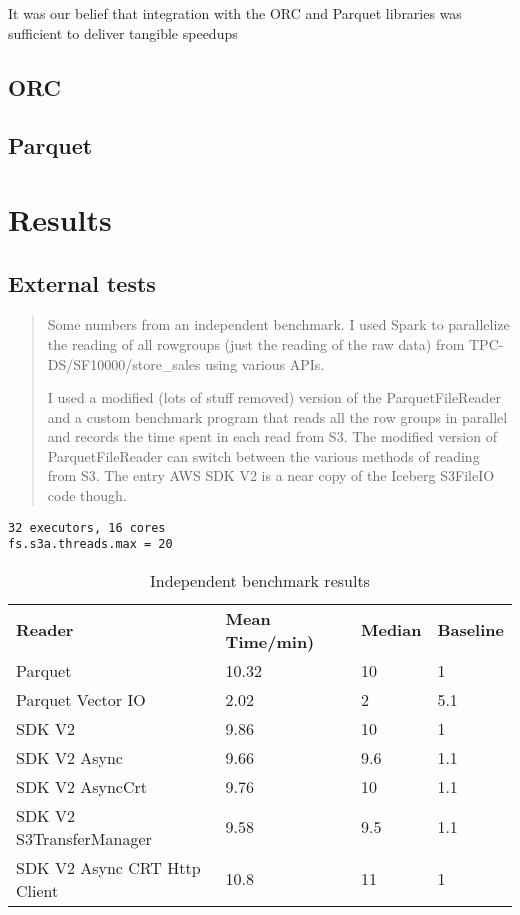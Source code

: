 \documentclass[manuscript]{acmart}
\begin{document}
It was our belief that integration with the ORC and Parquet libraries was
sufficient to deliver tangible speedups
\subsection{ORC}\label{subsec:orc}

\subsection{Parquet}\label{subsec:parquet}



\section{Results}
\label{sec:results}

\subsection{External tests}\label{subsec:external-tests}

\begin{quotation}
 Some numbers from an independent benchmark.
 I used Spark to parallelize the reading of all rowgroups (just the reading of the raw data)
 from TPC-DS/SF10000/store_sales using various APIs.

I used a modified (lots of stuff removed) version of the ParquetFileReader and a custom
benchmark program that reads all the row groups in parallel and records the time spent in each read from S3.
The modified version of ParquetFileReader can switch between the various methods of reading from S3.
The entry AWS SDK V2 is a near copy of the Iceberg S3FileIO code though.

\end{quotation}

\begin{verbatim}
32 executors, 16 cores
fs.s3a.threads.max = 20
\end{verbatim}

\begin{table}
  \begin{tabular}{ l l l l }
    \hline
    \textbf{Reader} & \textbf{Mean Time/min)} & \textbf{Median} & \textbf{Baseline}\\
    Parquet	& 10.32	& 10 & 1 \\
    Parquet Vector IO	& 2.02 & 2	& 5.1 \\
    SDK V2 & 9.86 & 10 & 1 \\
    SDK V2 Async & 9.66	& 9.6 & 1.1 \\
    SDK V2 AsyncCrt	& 9.76 & 10 & 1.1 \\
    SDK V2 S3TransferManager & 9.58 & 9.5 & 1.1 \\
    SDK V2 Async CRT Http Client & 10.8 & 11 & 1 \\
    \hline
  \end{tabular}
\caption{Independent benchmark results}
\label{tab:independent-benchmark-results}
\end{table}
\end{document}
